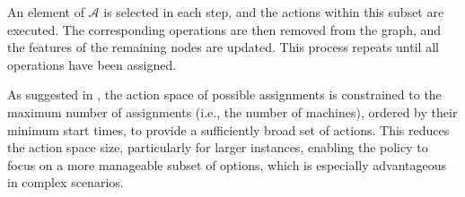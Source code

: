 An element of $\mathcal{A}$ is selected in each step, and the actions within this subset are executed. The corresponding operations are then removed from the graph, and the features of the remaining nodes are updated. This process repeats until all operations have been assigned.

As suggested in \cite{echeverria2024multi}, the action space of possible assignments is constrained to the maximum number of assignments (i.e., the number of machines), ordered by their minimum start times, to provide a sufficiently broad set of actions. This reduces the action space size, particularly for larger instances, enabling the policy to focus on a more manageable subset of options, which is especially advantageous in complex scenarios.


